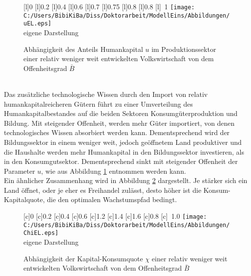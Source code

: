 \begin{figure}[htb] 
\vspace{0.13cm}
 \centering 
		[l]{\footnotesize{0}}
		[l]{\footnotesize{0.2}}
		[l]{\footnotesize{0.4}}
		[l]{\footnotesize{0.6}}
		[l]{\footnotesize{0.7}}
		[l]{\footnotesize{0.75}}
		[l]{\footnotesize{0.8}}
		[l]{\footnotesize{0.8}}
		[l]{~\footnotesize{1}}
\texttt{[image: C:/Users/BibiKiBa/Diss/Doktorarbeit/ModellEins/Abbildungen/uEL.eps]}
\\
\hfill\footnotesize{}  eigene Darstellung
	\caption{Abhängigkeit des Anteils Humankapital $u$ im Produktionssektor einer relativ weniger weit entwickelten Volkswirtschaft von dem Offenheitsgrad $\bar{B}$}
	\label{fig:VeränderungHumankapitalOffenheitEL}
\end{figure}
\\
Das zusätzliche technologische Wissen durch den Import von relativ humankapitalreicheren Gütern führt zu einer Umverteilung des Humankapitalbestandes auf die beiden Sektoren Konsumgüterproduktion und Bildung. Mit steigender Offenheit, werden mehr Güter importiert, von denen technologisches Wissen absorbiert werden kann. Dementsprechend wird der Bildungssektor in einem weniger weit, jedoch geöffnetem Land produktiver und die Haushalte werden mehr Humankapital in den Bildungssektor investieren, als in den Konsumgutsektor. Dementsprechend sinkt mit steigender Offenheit der Parameter $u$, wie aus Abbildung \ref{fig:VeränderungHumankapitalOffenheitEL} entnommen werden kann.\\
Ein ähnlicher Zusammenhang wird in Abbildung \ref{fig:ChiEL} dargestellt. Je stärker sich ein Land öffnet, oder je eher es Freihandel zulässt, desto höher ist die Konsum-Kapitalquote, die den optimalen Wachstumspfad bedingt. 
\begin{figure}[htb] 
\vspace{0.23cm}
 \centering 
		[c]{\footnotesize{0}}
		[c]{\footnotesize{0.2}}
		[c]{\footnotesize{0.4}}
		[c]{\footnotesize{0.6}}
		[c]{\footnotesize{1.2}}
		[c]{\footnotesize{1.4}}
		[c]{\footnotesize{1.6}}
		[c]{\footnotesize{0.8}}
		[c]{~\footnotesize{1.0}}
\texttt{[image: C:/Users/BibiKiBa/Diss/Doktorarbeit/ModellEins/Abbildungen/ChiEL.eps]}
\\
\hfill\footnotesize{}  eigene Darstellung
	\caption{Abhängigkeit der Kapital-Konsumquote $\chi$ einer relativ weniger weit entwickelten Volkswirtschaft von dem Offenheitsgrad $\bar{B}$}
	\label{fig:ChiEL}
\end{figure}
